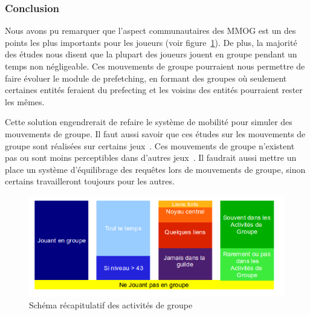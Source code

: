 \subsubsection{Conclusion}
Nous avons pu remarquer que l'aspect communautaires des MMOG est un des points les plus importants pour les joueurs (voir figure~\ref{recapstat}). De plus, la majorité des études nous disent que la plupart des joueurs jouent en groupe pendant un temps non négligeable. Ces mouvements de groupe pourraient nous permettre de faire évoluer le module de prefetching, en formant des groupes où seulement certaines entités feraient du prefecting et les voisins des entités pourraient rester les mêmes.
\par Cette solution engendrerait de refaire le système de mobilité pour simuler des mouvements de groupe. Il faut aussi savoir que ces études sur les mouvements de groupe sont réalisées sur certains jeux~\cite{wow,everquest}. Ces mouvements de groupe n'existent pas ou sont moins perceptibles dans d'autres jeux~\cite{sl}. Il faudrait aussi mettre un place un système d'équilibrage des requêtes lors de mouvements de groupe, sinon certains travailleront toujours pour les autres.

	\vspace{5cm}
	\begin{figure}[!h]
        \centering
        \includegraphics[scale=0.65]{./Ressources/Images/recapstat.png}
        \caption{Schéma récapitulatif des activités de groupe}
        \label{recapstat}
        \end{figure}

 
